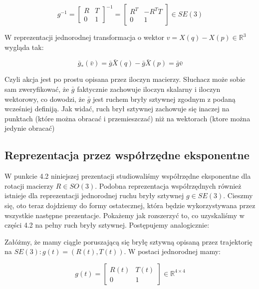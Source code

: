 \documentclass[a4paper,12pt]{article}
\newcommand{\RR}{\mathbb{R}^3}
\newcommand{\RRRq}{\mathbb{R}^{4 \times 4}}
\begin{document}
\begin{equation}
g^{-1}=\begin{bmatrix} R & T \\ 0 & 1 \end{bmatrix}^{-1}=\begin{bmatrix} R^T & -R^TT \\ 0 & 1 \end{bmatrix} \in SE(3)
\end{equation}

W reprezentacji jednorodnej transformacja o wektor $v = X(q) - X(p) \in \RR$ wygląda tak:

\begin{equation}
\bar{g}_*(\bar{v}) = \bar{g}\bar{X}(q) - \bar{g}\bar{X}(p) = \bar{g}\bar{v}
\end{equation}

Czyli akcja jest po prostu opisana przez iloczyn macierzy. Słuchacz może sobie sam zweryfikować, że $\bar{g}$ faktycznie zachowuje iloczyn skalarny i iloczyn wektorowy, co dowodzi, że $\bar{g}$ jest ruchem bryły sztywnej zgodnym z podaną wcześniej definiją. Jak widać, ruch brył sztywnej zachowuje się inaczej na punktach (które można obracać i przemieszczać) niż na wektorach (ktore można jedynie obracać)


\subsection{Reprezentacja przez współrzędne eksponentne}

W punkcie 4.2 niniejszej prezentacji studiowaliśmy współrzędne eksponentne dla rotacji macierzy $R \in SO(3)$. Podobna reprezentacja współrzędnych również istnieje dla reprezentacji jednorodnej ruchu bryły sztywnej $g \in SE(3)$. Cieszmy się, oto teraz dojdziemy do formy ostatecznej, która będzie wykorzystywana przez wszystkie następne prezentacje. Pokażemy jak rozszerzyć to, co uzyskaliśmy w części 4.2 na pełny ruch bryły sztywnej. Postępujemy analogicznie:

Załóżmy, że mamy ciągle poruszającą się bryłę sztywną opisaną przez trajektorię na $SE(3): g(t)=(R(t),T(t))$. W postaci jednorodnej mamy:

\begin{equation}
g(t)=\begin{bmatrix} R(t) & T(t) \\ 0 & 1 \end{bmatrix} \in \RRRq
\end{equation}
\end{document}
